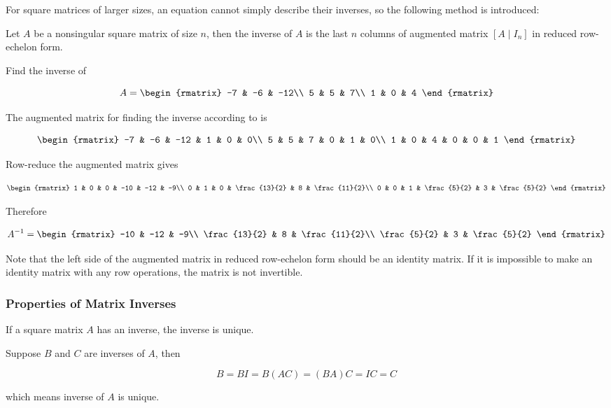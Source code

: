 \documentclass[a4paper,12pt]{article}
\begin{document}
For square matrices of larger sizes, an equation cannot simply describe their inverses, so the following method is introduced:

\begin{thm}
  Let $A$ be a nonsingular square matrix of size $n$, then the inverse of $A$ is the last $n$ columns of augmented matrix $[A\!\mid\!I_{n}]$ in reduced row-echelon form.
\end{thm}\n

\begin{exm}
  Find the inverse of

  $$A=\begin{rmatrix}
    -7 & -6 & -12\\
    5 & 5 & 7\\
    1 & 0 & 4
  \end{rmatrix}$$\s

  The augmented matrix for finding the inverse according to \rthm[\sctr{1}] is

  $$\begin{rmatrix}
    -7 & -6 & -12 & 1 & 0 & 0\\
    5 & 5 & 7 & 0 & 1 & 0\\
    1 & 0 & 4 & 0 & 0 & 1
  \end{rmatrix}$$\s

  Row-reduce the augmented matrix gives

  $$\begin{rmatrix}
    1 & 0 & 0 & -10 & -12 & -9\\
    0 & 1 & 0 & \frac{13}{2} & 8 & \frac{11}{2}\\
    0 & 0 & 1 & \frac{5}{2} & 3 & \frac{5}{2}
  \end{rmatrix}$$\s

  Therefore

  $$A^{-1}=\begin{rmatrix}
    -10 & -12 & -9\\
    \frac{13}{2} & 8 & \frac{11}{2}\\
    \frac{5}{2} & 3 & \frac{5}{2}
  \end{rmatrix}$$
\end{exm}\n

Note that the left side of the augmented matrix in reduced row-echelon form should be an identity matrix. If it is impossible to make an identity matrix with any row operations, the matrix is not invertible.

\subsubsection{Properties of Matrix Inverses}
\begin{pst}
  If a square matrix $A$ has an inverse, the inverse is unique.\n

  \prf Suppose $B$ and $C$ are inverses of $A$, then

  $$B=BI=B(AC)=(BA)C=IC=C$$\s

  which means inverse of $A$ is unique.
\end{pst}\n
\end{document}
